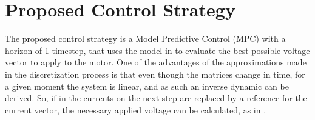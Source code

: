 \documentclass[9pt,conference]{IEEEtran}
\begin{document}
\section{Proposed Control Strategy}
The proposed control strategy is a Model Predictive Control (MPC) with a horizon of 1 timestep, that uses the model in  to evaluate the best possible voltage vector to apply to the motor. One of the advantages of the approximations made in the discretization process is that even though the matrices change in time, for a given moment the system is linear, and as such an inverse dynamic can be derived. So, if in  the currents on the next step are replaced by a reference for the current vector, the necessary applied voltage can be calculated, as in .
\end{document}
